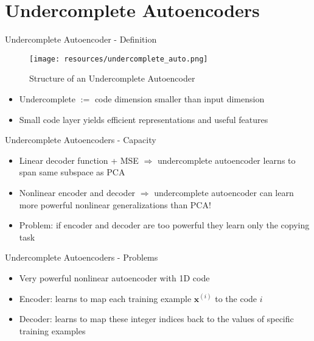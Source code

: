 \documentclass[handout]{beamer}
\begin{document}
\section{Undercomplete Autoencoders}
\begin{frame}[t]{Undercomplete Autoencoder - Definition}
    \begin{figure}[h]
        \centering
        \texttt{[image: resources/undercomplete\_auto.png]} 
        \caption{Structure of an Undercomplete Autoencoder}
    \end{figure}
    \begin{itemize}
        \pause
        \item Undercomplete $:=$ code dimension smaller than input dimension
            \pause
        \item Small code layer yields efficient representations and useful features  
        
    \end{itemize} 
\end{frame}

\begin{frame}[t]{Undercomplete Autoencoders - Capacity}
    \begin{itemize}
        \pause
        \item Linear decoder function + MSE $\Rightarrow$ undercomplete autoencoder learns to span same subspace as PCA
            \pause
        \item Nonlinear encoder and decoder $\Rightarrow$ undercomplete autoencoder can learn more powerful nonlinear generalizations than PCA!
            \pause
        \item Problem: if encoder and decoder are too powerful they learn only the copying task 
    \end{itemize}
\end{frame}


\begin{frame}[t]{Undercomplete Autoencoders - Problems}
    \begin{example}
        \begin{itemize}
            \item Very powerful nonlinear autoencoder with 1D code
        \pause
            \item Encoder: learns to map each training example $\pmb{x}^{(i)}$ to the code $i$
        \pause
            \item Decoder: learns to map these integer indices back to the values of specific training examples
        \end{itemize}
    \end{example}
\end{frame}
\end{document}
